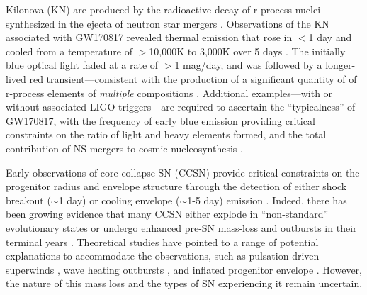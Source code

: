 \documentclass[12pt, letterpaper]{article}
\begin{document}
\smallskip
{} 
Kilonova (KN) are produced by the radioactive decay of r-process nuclei synthesized in the ejecta of neutron star mergers \citep{Li1998}.  Observations of the KN associated with GW170817 revealed thermal emission that rose in $<$1 day and cooled from a temperature of $>$10,000K to 3,000K over 5 days \citep{Drout2017}. The initially blue optical light faded at a rate of $>$1 mag/day, and was followed by a longer-lived red transient---consistent with the production of a significant quantity of of r-process elements of \emph{multiple} compositions \citep{Drout2017,Villar2017,Tanvir2017,Smartt2017,Kasliwal2017}.  Additional examples---with or without associated LIGO triggers---are required to ascertain the ``typicalness'' of GW170817, with the frequency of early blue emission providing critical constraints on the ratio of light and heavy elements formed, and the total contribution of NS mergers to cosmic nucleosynthesis \citep{Rosswog2018,Piro2018,Metzger2018}. 

\smallskip
{} Early observations of core-collapse SN (CCSN) provide critical constraints on the progenitor radius and envelope structure through the detection of either shock breakout ($\sim$1 day) or cooling envelope ($\sim$1-5 day) emission \citep{Nakar2010,Arcavi2011,Bersten2018}. Indeed, there has been growing evidence that many CCSN either explode in ``non-standard'' evolutionary states or undergo enhanced pre-SN mass-loss and outbursts in their terminal years \citep{Khazov2016,Nakar2014}. Theoretical studies have pointed to a range of potential explanations to accommodate the observations, such as pulsation-driven superwinds \citep{Yoon2010}, wave heating outbursts \citep{Fuller2017}, and inflated progenitor envelope \citep{Grafener2012}. However, the nature of this mass loss and the types of SN experiencing it remain uncertain.
\end{document}
